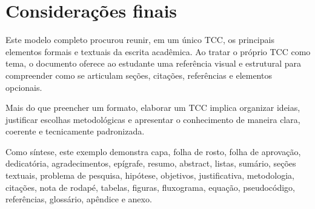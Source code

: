 %
%
%
%
%

\chapter{Considerações finais}

Este modelo completo procurou reunir, em um único TCC, os principais elementos formais e textuais da escrita acadêmica. Ao tratar o próprio TCC como tema, o documento oferece ao estudante uma referência visual e estrutural para compreender como se articulam seções, citações, referências e elementos opcionais.

Mais do que preencher um formato, elaborar um TCC implica organizar ideias, justificar escolhas metodológicas e apresentar o conhecimento de maneira clara, coerente e tecnicamente padronizada.

Como síntese, este exemplo demonstra capa, folha de rosto, folha de aprovação, dedicatória, agradecimentos, epígrafe, resumo, abstract, listas, sumário, seções textuais, problema de pesquisa, hipótese, objetivos, justificativa, metodologia, citações, nota de rodapé, tabelas, figuras, fluxograma, equação, pseudocódigo, referências, glossário, apêndice e anexo.
